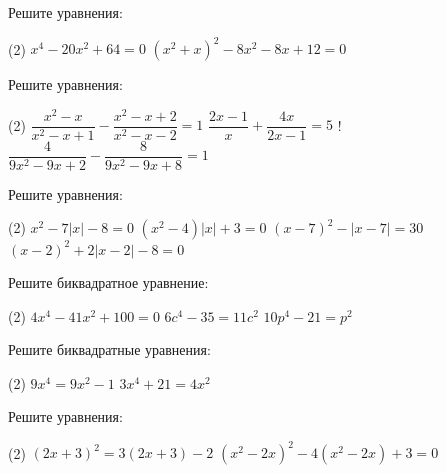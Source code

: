 %
%

\begin{class}[number=1]
	\begin{listofex}
		\item Решите уравнения:
		\begin{tasks}(2)
			\task \( x^4-20x^2+64=0 \)
			\task \( (x^2+x)^2-8x^2-8x+12=0 \)
		\end{tasks}
		\item Решите уравнения:
		\begin{tasks}(2)
			\task \( \dfrac{x^2-x}{x^2-x+1}-\dfrac{x^2-x+2}{x^2-x-2}=1 \)
			\task \( \dfrac{2x-1}{x}+\dfrac{4x}{2x-1}=5 \)
			\task! \( \dfrac{4}{9x^2-9x+2}-\dfrac{8}{9x^2-9x+8}=1 \)
		\end{tasks}
		\item Решите уравнения:
		\begin{tasks}(2)
			\task \( x^2-7|x|-8=0 \)
			\task \( (x^2-4)|x|+3=0 \)
			\task \( (x-7)^2-|x-7|=30 \)
			\task \( (x-2)^2+2|x-2|-8=0 \)
		\end{tasks}
	\end{listofex}
\end{class}

\begin{class}[number=2]
	\begin{listofex}
		\item Решите биквадратное уравнение:
		\begin{tasks}(2)
			\task 
			\task \( 4x^4-41x^2+100=0 \)
			\task \( 6c^4-35=11c^2 \)
			\task \( 10p^4-21=p^2 \)
		\end{tasks}
	\end{listofex}
\end{class}

\begin{homework}[number=1]
	\begin{listofex}
		\item Решите биквадратные уравнения:
		\begin{tasks}(2)
			\task \( 9x^4=9x^2-1 \)
			\task \( 3x^4+21=4x^2 \)
		\end{tasks}
		\item Решите уравнения:
		\begin{tasks}(2)
			\task \( (2x+3)^2=3(2x+3)-2 \)
			\task \( (x^2-2x)^2-4(x^2-2x)+3=0 \)
		\end{tasks}
	\end{listofex}
\end{homework}

